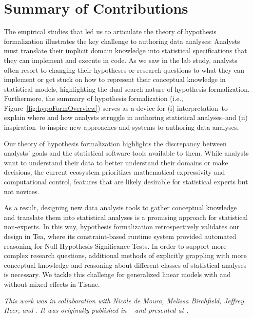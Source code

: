 

\section{Summary of Contributions}


The empirical studies that led us to articulate the theory of hypothesis
formalization illustrates the key challenge to authoring data analyses: Analysts
must translate their implicit domain knowledge into statistical specifications
that they can implement and execute in code. As we saw in the lab study,
analysts often resort to changing their hypotheses or research questions to what
they can implement or get stuck on how to represent their conceptual knowledge
in statistical models, highlighting the dual-search nature of hypothesis
formalization. Furthermore, the summary of hypothesis formalization (i.e.,
Figure~\ref{fig:hypoFormOverview}) serves as a device for (i) interpretation--to
explain where and how analysts struggle in authoring statistical analyses--and
(ii) inspiration--to inspire new approaches and systems to authoring data
analyses. 

Our theory of hypothesis formalization highlights the discrepancy between
analysts' goals and the statistical software tools available to them. While
analysts want to understand their data to better understand their domains or
make decisions, the current ecosystem prioritizes mathematical expressivity and
computational control, features that are likely desirable for statistical
experts but not novices. 

As a result, designing new data analysis tools to gather conceptual knowledge
and translate them into statistical analyses is a promising approach for
statistical non-experts. In this way, hypothesis formalization retrospectively
validates our design in Tea, where its constraint-based runtime system provided
automated reasoning for Null Hypothesis Significance Tests. In order to support
more complex research questions, additional methods of explicitly grappling with
more conceptual knowledge and reasoning about different classes of statistical
analyses is necessary. We tackle this challenge for generalized linear models
with and without mixed effects in Tisane. 

\textit{This work was in collaboration with Nicole de Moura, Melissa Birchfield, Jeffrey
Heer, and \reneJust. It was originally published in ~\cite{} and presented
at .}